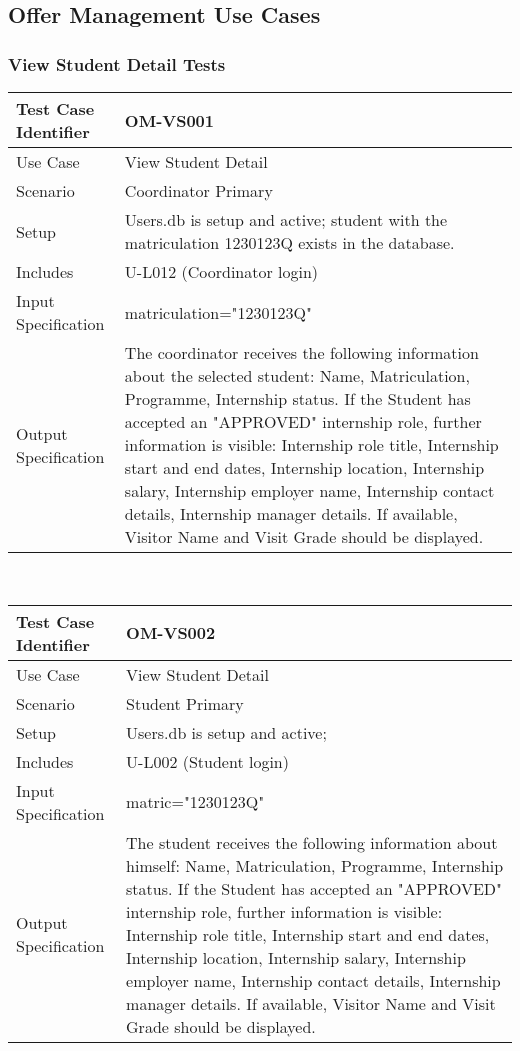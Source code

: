 \documentclass{l3deliverable}
\begin{document}
\newpage
\subsection{Offer Management Use Cases}
\subsubsection{View Student Detail Tests}
\begin{tabular}{lp{10cm}}
\hline 
\textbf{Test Case Identifier} & OM-VS001\tabularnewline
\hline 
\hline 
Use Case & View Student Detail \tabularnewline
\hline 
Scenario & Coordinator Primary \tabularnewline
\hline 
Setup & Users.db is setup and active; student with the matriculation 1230123Q exists in the database. \tabularnewline
\hline 
Includes & U-L012 (Coordinator login) \tabularnewline
\hline 
Input Specification & matriculation="1230123Q" \tabularnewline
\hline 
Output Specification &  The coordinator receives the following information about the selected student: Name, Matriculation, Programme, Internship status. If the Student has accepted an "APPROVED" internship role, further information is visible: Internship role title, Internship start and end dates, Internship location, Internship salary, Internship employer name, Internship contact details, Internship manager details. If available, Visitor Name and Visit Grade should be displayed.\tabularnewline
\hline 
\end{tabular}\\


\begin{tabular}{lp{10cm}}
\hline 
\textbf{Test Case Identifier} & OM-VS002\tabularnewline
\hline 
\hline 
Use Case & View Student Detail \tabularnewline
\hline 
Scenario & Student Primary \tabularnewline
\hline 
Setup & Users.db is setup and active; \tabularnewline
\hline 
Includes & U-L002 (Student login) \tabularnewline
\hline 
Input Specification & matric="1230123Q" \tabularnewline
\hline 
Output Specification &  The student receives the following information about himself: Name, Matriculation, Programme, Internship status. If the Student has accepted an "APPROVED" internship role, further information is visible: Internship role title, Internship start and end dates, Internship location, Internship salary, Internship employer name, Internship contact details, Internship manager details. If available, Visitor Name and Visit Grade should be displayed.\tabularnewline
\hline 
\end{tabular}\\
\end{document}
